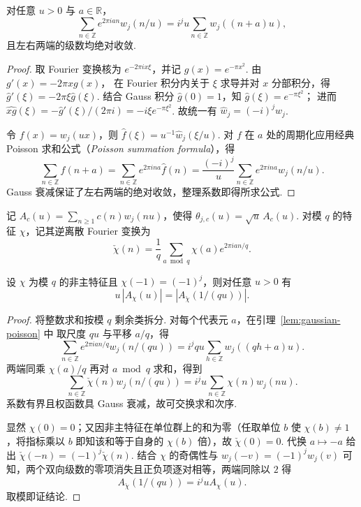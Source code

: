 \begin{lemma}
\label{lem:gaussian-poisson}
\emitthmsource
对任意 $u>0$ 与 $a\in\mathbb R$，
\[
 \sum_{n\in\mathbb Z} e^{2\pi ian}w_j(n/u)
   =i^j u\sum_{n\in\mathbb Z}w_j((n+a)u),
\]
且左右两端的级数均绝对收敛.
\end{lemma}
\begin{proof}
取 Fourier 变换核为 $e^{-2\pi i x\xi}$，并记
$g(x)=e^{-\pi x^2}$. 由 $g'(x)=-2\pi xg(x)$，
在 Fourier 积分内关于 $\xi$ 求导并对 $x$ 分部积分，得
$\widehat g'(\xi)=-2\pi\xi\widehat g(\xi)$.
结合 Gauss 积分 $\widehat g(0)=1$，知 $\widehat g(\xi)=e^{-\pi\xi^2}$；
进而 $\widehat{xg}(\xi)=-\widehat g'(\xi)/(2\pi i)=-i\xi e^{-\pi\xi^2}$.
故统一有 $\widehat w_j=(-i)^jw_j$.

令 $f(x)=w_j(ux)$，则 $\widehat f(\xi)=u^{-1}\widehat w_j(\xi/u)$.
对 $f$ 在 $a$ 处的周期化应用经典 Poisson 求和公式（\emph{Poisson summation formula}），得
\[
 \sum_{n\in\mathbb Z}f(n+a)
 = \sum_{n\in\mathbb Z}e^{2\pi ina}\widehat f(n)
 =\frac{(-i)^j}{u}\sum_{n\in\mathbb Z}e^{2\pi ina}w_j(n/u).
\]
Gauss 衰减保证了左右两端的绝对收敛，整理系数即得所求公式.
\end{proof}

记 $A_c(u)=\sum_{n\ge1}c(n)w_j(nu)$，使得 $\theta_{j,c}(u)=\sqrt u\,A_c(u)$.
对模 $q$ 的特征 $\chi$，记其逆离散 Fourier 变换为
\[
 \check\chi(n)=\frac1q\sum_{a\bmod q}\chi(a)e^{2\pi ian/q}.
\]

\begin{lemma}
\label{lem:theta-poisson-classes}
\emitthmsource
设 $\chi$ 为模 $q$ 的非主特征且 $\chi(-1)=(-1)^j$，则对任意 $u>0$ 有
\[
 u\,|A_\chi(u)|=|A_{\check\chi}(1/(qu))|.
\]
\end{lemma}
\begin{proof}
将整数求和按模 $q$ 剩余类拆分. 对每个代表元 $a$，在引理~\ref{lem:gaussian-poisson} 中
取尺度 $qu$ 与平移 $a/q$，得
\[
 \sum_{n\in\mathbb Z} e^{2\pi ian/q}w_j(n/(qu))
 =i^jqu\sum_{h\in\mathbb Z}w_j((qh+a)u).
\]
两端同乘 $\chi(a)/q$ 再对 $a\bmod q$ 求和，得到
\[
 \sum_{n\in\mathbb Z}\check\chi(n)w_j(n/(qu))
   =i^j u\sum_{n\in\mathbb Z}\chi(n)w_j(nu).
\]
系数有界且权函数具 Gauss 衰减，故可交换求和次序.

显然 $\chi(0)=0$；又因非主特征在单位群上的和为零（任取单位 $b$ 使 $\chi(b)\ne1$，将指标乘以 $b$ 即知该和等于自身的 $\chi(b)$ 倍），故 $\check\chi(0)=0$.
代换 $a\mapsto-a$ 给出 $\check\chi(-n)=(-1)^j\check\chi(n)$.
结合 $\chi$ 的奇偶性与 $w_j(-v)=(-1)^jw_j(v)$ 可知，两个双向级数的零项消失且正负项逐对相等，两端同除以 $2$ 得
\[
 A_{\check\chi}(1/(qu))=i^j u A_\chi(u).
\]
取模即证结论.
\end{proof}


